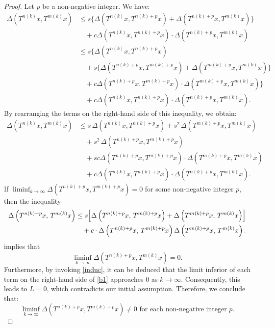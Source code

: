 \documentclass[pdflatex,sn-mathphys-num]{sn-jnl}%
\theoremstyle{thmstyleone}%
\theoremstyle{thmstyletwo}%
\theoremstyle{thmstylethree}%
\begin{document}
\begin{proof}
Let \(p\) be a non-negative integer. We have:
\begin{align}
\Delta(T^{n(k)}x, T^{m(k)}x) &\le s \big\{ \Delta(T^{n(k)}x, T^{n(k)+p}x) + \Delta(T^{n(k)+p}x, T^{m(k)}x) \big\} \nonumber \\
&\quad+c{ \Delta(T^{n(k)}x, T^{n(k)+p}x)\cdot \Delta(T^{n(k)+p}x, T^{m(k)}x)}\nonumber\\
&\le s \big\{ \Delta(T^{n(k)}x, T^{n(k)+p}x) \nonumber \\
&\quad + s \big\{ \Delta(T^{n(k)+p}x, T^{m(k)+p}x) + \Delta(T^{m(k)+p}x, T^{m(k)}x)\big\}\nonumber\\
& \quad + c\Delta(T^{n(k)+p}x, T^{m(k)+p}x) \cdot \Delta(T^{m(k)+p}x, T^{m(k)}x) \big\} \nonumber \\
&\quad+c\Delta(T^{n(k)}x, T^{n(k)+p}x) \cdot \Delta(T^{n(k)+p}x, T^{m(k)}x).\nonumber
\end{align}
By rearranging the terms on the right-hand side of this inequality, we obtain:
\begin{align}\label{b1}
\Delta(T^{n(k)}x, T^{m(k)}x) &\le s \, \Delta(T^{n(k)}x, T^{n(k)+p}x) + s^{2} \, \Delta(T^{m(k)+p}x, T^{m(k)}x) \nonumber \\
&\quad + s^{2} \, \Delta(T^{n(k)+p}x, T^{m(k)+p}x)\\
&\quad+ sc\Delta(T^{n(k)+p}x, T^{m(k)+p}x) \cdot \Delta(T^{m(k)+p}x, T^{m(k)}x)\nonumber\\
&\quad+c\Delta(T^{n(k)}x, T^{n(k)+p}x) \cdot \Delta(T^{n(k)+p}x, T^{m(k)}x).\nonumber
\end{align}
If \( \liminf_{k \to \infty} \Delta(T^{n(k)+p}x, T^{m(k)+p}x) = 0 \) for some non-negative integer \( p \), then the inequality
\begin{align}\label{b12}
\Delta\left(T^{n(k)+p}x, \, T^{m(k)}x\right) 
&\leq s \Bigl[ \Delta\left(T^{n(k)+p}x, \, T^{m(k)+p}x\right) + \Delta\left(T^{m(k)+p}x, \, T^{m(k)}x\right) \Bigr] \nonumber \\
&\quad + c \cdot \Delta\left(T^{n(k)+p}x, \, T^{m(k)+p}x\right) \Delta\left(T^{m(k)+p}x, \, T^{m(k)}x\right).
\end{align}
 implies that 
\[
\liminf_{k \to \infty} \Delta(T^{n(k)+p}x, T^{m(k)}x) = 0.
\] 
Furthermore, by invoking \eqref{induc}, it can be deduced that the limit inferior of each term on the right-hand side of \eqref{b1} approaches \( 0 \) as \( k \to \infty \). Consequently, this leads to \( L = 0 \), which contradicts our initial assumption. Therefore, we conclude that:
\[
\liminf_{k\to \infty}\Delta(T^{n(k)+p}x, T^{m(k)+p}x)\not=0 \text{ for each non-negative integer } p.
\]
\end{proof}
\end{document}
